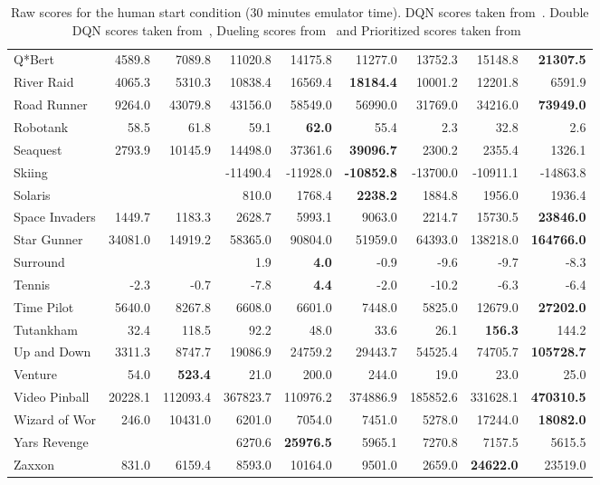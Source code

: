 \documentclass{article} \usepackage{times}
\begin{document}
\begin{table*}[h]
\begin{scriptsize}
\begin{tabular}{lrrrrrrrr}
Q*Bert & 4589.8 & 7089.8 & 11020.8 & 14175.8 & 11277.0 & 13752.3 & 15148.8 & \textbf{21307.5}\\
River Raid & 4065.3 & 5310.3 & 10838.4 & 16569.4 & \textbf{18184.4} & 10001.2 & 12201.8 & 6591.9\\
Road Runner & 9264.0 & 43079.8 & 43156.0 & 58549.0 & 56990.0 & 31769.0 & 34216.0 & \textbf{73949.0}\\
Robotank & 58.5 & 61.8 & 59.1 & \textbf{62.0} & 55.4 & 2.3 & 32.8 & 2.6\\
Seaquest & 2793.9 & 10145.9 & 14498.0 & 37361.6 & \textbf{39096.7} & 2300.2 & 2355.4 & 1326.1\\
Skiing &  &  & -11490.4 & -11928.0 & \textbf{-10852.8} & -13700.0 & -10911.1 & -14863.8\\
Solaris &  &  & 810.0 & 1768.4 & \textbf{2238.2} & 1884.8 & 1956.0 & 1936.4\\
Space Invaders & 1449.7 & 1183.3 & 2628.7 & 5993.1 & 9063.0 & 2214.7 & 15730.5 & \textbf{23846.0}\\
Star Gunner & 34081.0 & 14919.2 & 58365.0 & 90804.0 & 51959.0 & 64393.0 & 138218.0 & \textbf{164766.0}\\
Surround &  &  & 1.9 & \textbf{4.0} & -0.9 & -9.6 & -9.7 & -8.3\\
Tennis & -2.3 & -0.7 & -7.8 & \textbf{4.4} & -2.0 & -10.2 & -6.3 & -6.4\\
Time Pilot & 5640.0 & 8267.8 & 6608.0 & 6601.0 & 7448.0 & 5825.0 & 12679.0 & \textbf{27202.0}\\
Tutankham & 32.4 & 118.5 & 92.2 & 48.0 & 33.6 & 26.1 & \textbf{156.3} & 144.2\\
Up and Down & 3311.3 & 8747.7 & 19086.9 & 24759.2 & 29443.7 & 54525.4 & 74705.7 & \textbf{105728.7}\\
Venture & 54.0 & \textbf{523.4} & 21.0 & 200.0 & 244.0 & 19.0 & 23.0 & 25.0\\
Video Pinball & 20228.1 & 112093.4 & 367823.7 & 110976.2 & 374886.9 & 185852.6 & 331628.1 & \textbf{470310.5}\\
Wizard of Wor & 246.0 & 10431.0 & 6201.0 & 7054.0 & 7451.0 & 5278.0 & 17244.0 & \textbf{18082.0}\\
Yars Revenge &  &  & 6270.6 & \textbf{25976.5} & 5965.1 & 7270.8 & 7157.5 & 5615.5\\
Zaxxon & 831.0 & 6159.4 & 8593.0 & 10164.0 & 9501.0 & 2659.0 & \textbf{24622.0} & 23519.0\\
     \end{tabular}
    \end{scriptsize}
    \caption{\label{fig-atari-full} Raw scores for the human start condition (30 minutes emulator time). DQN scores taken from~\cite{nair2015gorila}. Double DQN scores taken from~\cite{hado2015doubledqn}, Dueling scores from~\cite{wang2015dueling} and Prioritized scores taken from~\cite{schaul2015prioritized}}
\end{table*}

 
\end{document}
